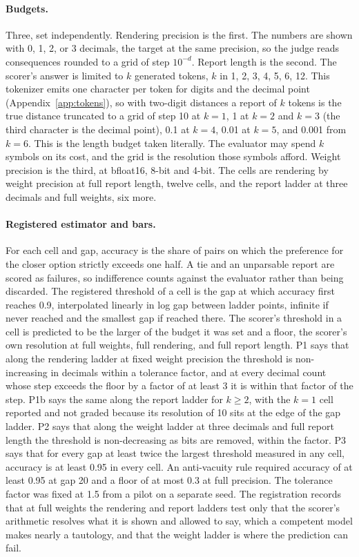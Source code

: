 \documentclass{article}
\theoremstyle{definition}
\theoremstyle{remark}
\begin{document}
\paragraph{Budgets.}
Three, set independently.
Rendering precision is the first. The numbers are shown with 0, 1, 2, or 3 decimals, the target at the same precision, so the judge reads consequences rounded to a grid of step $10^{-d}$.
Report length is the second. The scorer's answer is limited to $k$ generated tokens, $k$ in 1, 2, 3, 4, 5, 6, 12.
This tokenizer emits one character per token for digits and the decimal point (Appendix~\ref{app:tokens}), so with two-digit distances a report of $k$ tokens is the true distance truncated to a grid of step 10 at $k=1$, 1 at $k=2$ and $k=3$ (the third character is the decimal point), 0.1 at $k=4$, 0.01 at $k=5$, and 0.001 from $k=6$.
This is the length budget taken literally. The evaluator may spend $k$ symbols on its cost, and the grid is the resolution those symbols afford.
Weight precision is the third, at bfloat16, 8-bit and 4-bit.
The cells are rendering by weight precision at full report length, twelve cells, and the report ladder at three decimals and full weights, six more.

\paragraph{Registered estimator and bars.}
For each cell and gap, accuracy is the share of pairs on which the preference for the closer option strictly exceeds one half. A tie and an unparsable report are scored as failures, so indifference counts against the evaluator rather than being discarded.
The registered threshold of a cell is the gap at which accuracy first reaches 0.9, interpolated linearly in log gap between ladder points, infinite if never reached and the smallest gap if reached there.
The scorer's threshold in a cell is predicted to be the larger of the budget it was set and a floor, the scorer's own resolution at full weights, full rendering, and full report length.
P1 says that along the rendering ladder at fixed weight precision the threshold is non-increasing in decimals within a tolerance factor, and at every decimal count whose step exceeds the floor by a factor of at least 3 it is within that factor of the step.
P1b says the same along the report ladder for $k\ge2$, with the $k=1$ cell reported and not graded because its resolution of 10 sits at the edge of the gap ladder.
P2 says that along the weight ladder at three decimals and full report length the threshold is non-decreasing as bits are removed, within the factor.
P3 says that for every gap at least twice the largest threshold measured in any cell, accuracy is at least 0.95 in every cell.
An anti-vacuity rule required accuracy of at least 0.95 at gap 20 and a floor of at most 0.3 at full precision.
The tolerance factor was fixed at 1.5 from a pilot on a separate seed.
The registration records that at full weights the rendering and report ladders test only that the scorer's arithmetic resolves what it is shown and allowed to say, which a competent model makes nearly a tautology, and that the weight ladder is where the prediction can fail.
\end{document}
